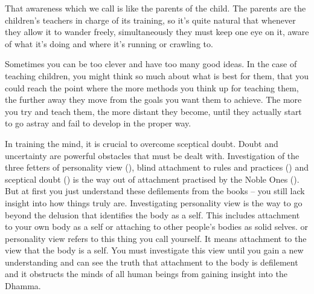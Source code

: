 That awareness which we call  is like the parents of the child. The parents are the children's teachers in charge of its training, so it's quite natural that whenever they allow it to wander freely, simultaneously they must keep one eye on it, aware of what it's doing and where it's running or crawling to. 

Sometimes you can be too clever and have too many good ideas. In the case of teaching children, you might think so much about what is best for them, that you could reach the point where the more methods you think up for teaching them, the further away they move from the goals you want them to achieve. The more you try and teach them, the more distant they become, until they actually start to go astray and fail to develop in the proper way. 

In training the mind, it is crucial to overcome sceptical doubt. Doubt and uncertainty are powerful obstacles that must be dealt with. Investigation of the three fetters of personality view (), blind attachment to rules and practices () and sceptical doubt () is the way out of attachment practised by the Noble Ones (). But at first you just understand these defilements from the books -- you still lack insight into how things truly are. Investigating personality view is the way to go beyond the delusion that identifies the body as a self. This includes attachment to your own body as a self or attaching to other people's bodies as solid selves.  or personality view refers to this thing you call yourself. It means attachment to the view that the body is a self. You must investigate this view until you gain a new understanding and can see the truth that attachment to the body is defilement and it obstructs the minds of all human beings from gaining insight into the Dhamma.

